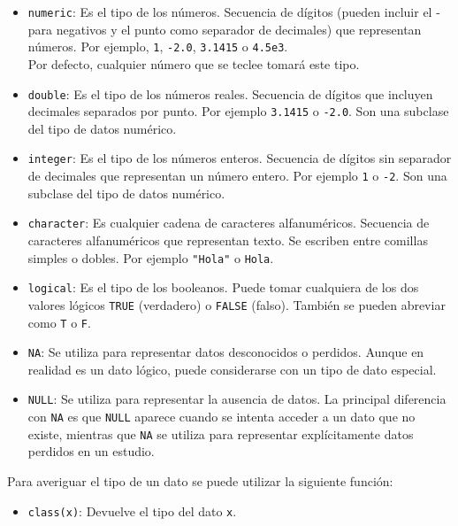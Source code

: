 \documentclass[
  a4paper,
]{scrreport}
\providecommand{\tightlist}{%
  \setlength{\itemsep}{0pt}\setlength{\parskip}{0pt}}\usepackage{longtable,booktabs,array}
\theoremstyle{definition}
\theoremstyle{definition}
\theoremstyle{remark}
\begin{document}
\begin{itemize}
\item
  \texttt{numeric}: Es el tipo de los números. Secuencia de dígitos
  (pueden incluir el - para negativos y el punto como separador de
  decimales) que representan números. Por ejemplo, \texttt{1},
  \texttt{-2.0}, \texttt{3.1415} o \texttt{4.5e3}.\\
  Por defecto, cualquier número que se teclee tomará este tipo.
\item
  \texttt{double}: Es el tipo de los números reales. Secuencia de
  dígitos que incluyen decimales separados por punto. Por ejemplo
  \texttt{3.1415} o \texttt{-2.0}. Son una subclase del tipo de datos
  numérico.
\item
  \texttt{integer}: Es el tipo de los números enteros. Secuencia de
  dígitos sin separador de decimales que representan un número entero.
  Por ejemplo \texttt{1} o \texttt{-2}. Son una subclase del tipo de
  datos numérico.
\item
  \texttt{character}: Es cualquier cadena de caracteres alfanuméricos.
  Secuencia de caracteres alfanuméricos que representan texto. Se
  escriben entre comillas simples o dobles. Por ejemplo \texttt{"Hola"}
  o \texttt{\textquotesingle{}Hola\textquotesingle{}}.
\item
  \texttt{logical}: Es el tipo de los booleanos. Puede tomar cualquiera
  de los dos valores lógicos \texttt{TRUE} (verdadero) o \texttt{FALSE}
  (falso). También se pueden abreviar como \texttt{T} o \texttt{F}.
\item
  \texttt{NA}: Se utiliza para representar datos desconocidos o
  perdidos. Aunque en realidad es un dato lógico, puede considerarse con
  un tipo de dato especial.
\item
  \texttt{NULL}: Se utiliza para representar la ausencia de datos. La
  principal diferencia con \texttt{NA} es que \texttt{NULL} aparece
  cuando se intenta acceder a un dato que no existe, mientras que
  \texttt{NA} se utiliza para representar explícitamente datos perdidos
  en un estudio.
\end{itemize}

Para averiguar el tipo de un dato se puede utilizar la siguiente
función:

\begin{itemize}
\tightlist
\item
  \texttt{class(x)}: Devuelve el tipo del dato \texttt{x}.
\end{itemize}
\end{document}
